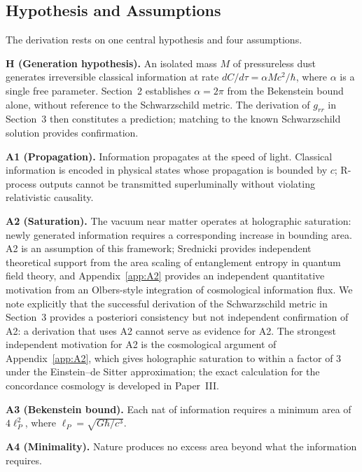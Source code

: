 \documentclass[12pt]{article}
\begin{document}
\subsection{Hypothesis and Assumptions}
\label{sec:hypothesis}

The derivation rests on one central hypothesis and four assumptions.

\medskip
\noindent\textbf{H (Generation hypothesis).}
An isolated mass $M$ of pressureless dust generates irreversible
classical information at rate
$dC/d\tau = \alpha Mc^2/\hbar$,
where $\alpha$ is a single free parameter.
Section~2 establishes $\alpha = 2\pi$ from the Bekenstein bound alone,
without reference to the Schwarzschild metric.
The derivation of $g_{rr}$ in Section~3 then constitutes a prediction;
matching to the known Schwarzschild solution provides confirmation.

\medskip
\noindent\textbf{A1 (Propagation).}
Information propagates at the speed of light.
Classical information is encoded in physical states whose propagation
is bounded by $c$; R-process outputs cannot be transmitted
superluminally without violating relativistic causality.

\medskip
\noindent\textbf{A2 (Saturation).}
The vacuum near matter operates at holographic saturation: newly
generated information requires a corresponding increase in bounding
area.
A2 is an assumption of this framework; Srednicki \cite{Srednicki1993}
provides independent theoretical support from the area scaling of
entanglement entropy in quantum field theory, and Appendix~\ref{app:A2}
provides an independent quantitative motivation from an Olbers-style
integration of cosmological information flux.
We note explicitly that the successful derivation of the Schwarzschild
metric in Section~3 provides a posteriori consistency but not
independent confirmation of A2: a derivation that uses A2 cannot serve
as evidence for A2.
The strongest independent motivation for A2 is the cosmological
argument of Appendix~\ref{app:A2}, which gives holographic saturation
to within a factor of 3 under the Einstein--de Sitter approximation;
the exact calculation for the concordance cosmology is developed in
Paper~III.

\medskip
\noindent\textbf{A3 (Bekenstein bound).}
Each nat of information requires a minimum area of $4\ell_P^2$, where
$\ell_P = \sqrt{G\hbar/c^3}$.

\medskip
\noindent\textbf{A4 (Minimality).}
Nature produces no excess area beyond what the information requires.
\end{document}
